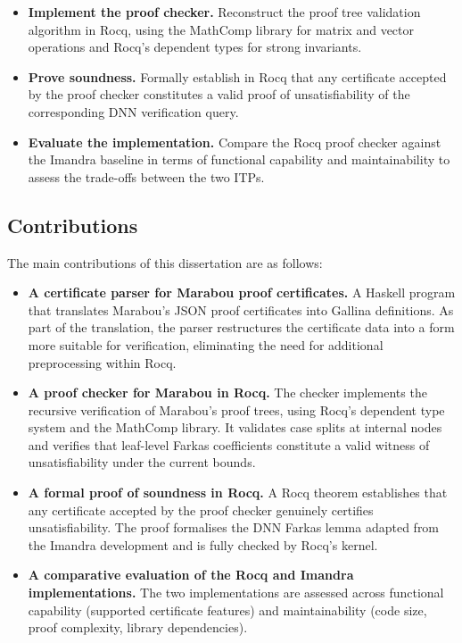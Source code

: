 \begin{itemize}
	\item \textbf{Implement the proof checker.} Reconstruct the proof tree validation algorithm in Rocq, using the MathComp library for matrix and vector operations and Rocq's dependent types for strong invariants.

	\item \textbf{Prove soundness.} Formally establish in Rocq that any certificate accepted by the proof checker constitutes a valid proof of unsatisfiability of the corresponding DNN verification query.

	\item \textbf{Evaluate the implementation.} Compare the Rocq proof checker against the Imandra baseline in terms of functional capability and maintainability to assess the trade-offs between the two ITPs.
\end{itemize}

\subsection{Contributions}

The main contributions of this dissertation are as follows:

\begin{itemize}
	\item \textbf{A certificate parser for Marabou proof certificates.} A Haskell program that translates Marabou's JSON proof certificates into Gallina definitions. As part of the translation, the parser restructures the certificate data into a form more suitable for verification, eliminating the need for additional preprocessing within Rocq.

	\item \textbf{A proof checker for Marabou in Rocq.} The checker implements the recursive verification of Marabou's proof trees, using Rocq's dependent type system and the MathComp library. It validates case splits at internal nodes and verifies that leaf-level Farkas coefficients constitute a valid witness of unsatisfiability under the current bounds.

	\item \textbf{A formal proof of soundness in Rocq.} A Rocq theorem establishes that any certificate accepted by the proof checker genuinely certifies unsatisfiability. The proof formalises the DNN Farkas lemma adapted from the Imandra development and is fully checked by Rocq's kernel.

	\item \textbf{A comparative evaluation of the Rocq and Imandra implementations.} The two implementations are assessed across functional capability (supported certificate features) and maintainability (code size, proof complexity, library dependencies).
\end{itemize}

